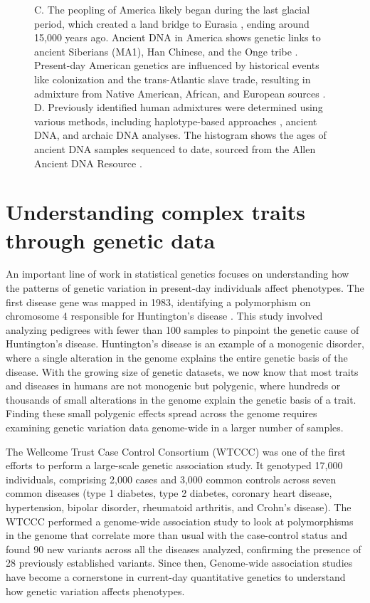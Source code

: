 \begin{figure}[h!]
{    %
    C. The peopling of America likely began during the last glacial period, which created a land bridge to Eurasia \cite{severinghaus1999abrupt}, ending around 15,000 years ago. Ancient DNA in America shows genetic links to ancient Siberians (MA1), Han Chinese, and the Onge tribe \cite{skoglund2016genomic}. Present-day American genetics are influenced by historical events like colonization and the trans-Atlantic slave trade, resulting in admixture from Native American, African, and European sources \cite{smith2004high, price2009sensitive}.
    D. Previously identified human admixtures were determined using various methods, including haplotype-based approaches \cite{hellenthal2014genetic, loh2013inferring, moorjani2011history, patterson2012ancient}, ancient DNA, and archaic DNA analyses. The histogram shows the ages of ancient DNA samples sequenced to date, sourced from the Allen Ancient DNA Resource \cite{mallick2024allen}.
    }
    \label{fig:gb-intro}
\end{figure}


\clearpage

\section{Understanding complex traits through genetic data}

An important line of work in statistical genetics focuses on understanding how the patterns of genetic variation in present-day individuals affect phenotypes. The first disease gene was mapped in 1983, identifying a polymorphism on chromosome 4 responsible for Huntington's disease \cite{Gusella1983}. This study involved analyzing pedigrees with fewer than 100 samples to pinpoint the genetic cause of Huntington's disease. Huntington's disease is an example of a monogenic disorder, where a single alteration in the genome explains the entire genetic basis of the disease. With the growing size of genetic datasets, we now know that most traits and diseases in humans are not monogenic but polygenic, where hundreds or thousands of small alterations in the genome explain the genetic basis of a trait. Finding these small polygenic effects spread across the genome requires examining genetic variation data genome-wide in a larger number of samples.

The Wellcome Trust Case Control Consortium (WTCCC) \cite{WTCCC2007} was one of the first efforts to perform a large-scale genetic association study. It genotyped 17,000 individuals, comprising 2,000 cases and 3,000 common controls across seven common diseases (type 1 diabetes, type 2 diabetes, coronary heart disease, hypertension, bipolar disorder, rheumatoid arthritis, and Crohn's disease). The WTCCC performed a genome-wide association study to look at polymorphisms in the genome that correlate more than usual with the case-control status and found 90 new variants across all the diseases analyzed, confirming the presence of 28 previously established variants. Since then, Genome-wide association studies have become a cornerstone in current-day quantitative genetics to understand how genetic variation affects phenotypes.


